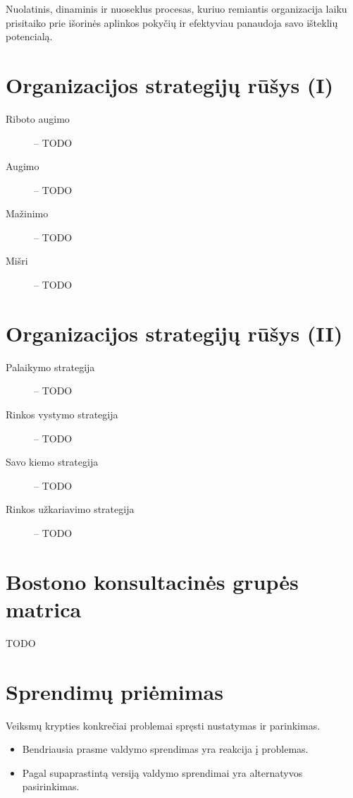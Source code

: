 \begin{defn}
  Nuolatinis, dinaminis ir nuoseklus procesas, kuriuo remiantis
  organizacija laiku prisitaiko prie išorinės aplinkos pokyčių ir
  efektyviau panaudoja savo išteklių potencialą.
\end{defn}

\section{Organizacijos strategijų rūšys (I)}

\begin{description}
  \item[Riboto augimo] – TODO
  \item[Augimo] – TODO
  \item[Mažinimo] – TODO
  \item[Mišri] – TODO
\end{description}

\section{Organizacijos strategijų rūšys (II)}

\begin{description}
  \item[Palaikymo strategija] – TODO
  \item[Rinkos vystymo strategija] – TODO
  \item[Savo kiemo strategija] – TODO
  \item[Rinkos užkariavimo strategija] – TODO
\end{description}

\section{Bostono konsultacinės grupės matrica}

TODO

\section{Sprendimų priėmimas}

\begin{defn}
  Veiksmų krypties konkrečiai problemai spręsti nustatymas ir parinkimas.
  \begin{itemize}
    \item Bendriausia prasme valdymo sprendimas yra reakcija į problemas.
    \item Pagal supaprastintą versiją valdymo sprendimai yra alternatyvos
      pasirinkimas.
  \end{itemize}
\end{defn}

